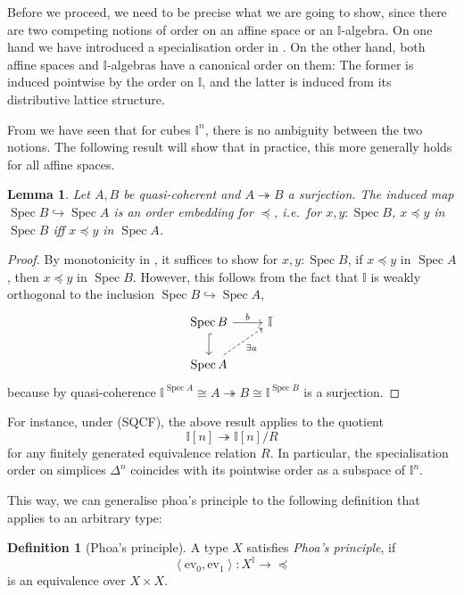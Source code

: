 \documentclass[12pt]{amsart}
\newtheorem{lemma}[theorem]{Lemma}
\theoremstyle{definition}
\newtheorem{definition}[theorem]{Definition}
\newcommand{\mbb}[1]{\mathbb{#1}}
\newcommand{\I}{\mbb I}
\newcommand{\pair}[1]{\left\langle#1\right\rangle}
\newcommand{\ev}{\mathrm{ev}}
\newcommand{\surj}{\twoheadrightarrow}
\newcommand{\hook}{\hookrightarrow}
\newcommand{\spec}{\operatorname{Spec}}
\begin{document}
Before we proceed, we need to be precise what we are going to show, since there are two competing notions of order on an affine space or an $\I$-algebra. On one hand we have introduced a specialisation order in . On the other hand, both affine spaces and $\I$-algebras have a canonical order on them: The former is induced pointwise by the order on $\I$, and the latter is induced from its distributive lattice structure. 

From  we have seen that for cubes $\I^n$, there is no ambiguity between the two notions. The following result will show that in practice, this more generally holds for all affine spaces.

\begin{lemma}\label{lem:orderonaffine}
  Let $A,B$ be quasi-coherent and $A \surj B$ a surjection. The induced map $\spec B \hook \spec A$ is an order embedding for $\preceq$, i.e.\ for $x,y : \spec B$, $x \preceq y$ in $\spec B$ iff $x \preceq y$ in $\spec A$.
\end{lemma}
\begin{proof}
  By monotonicity in , it suffices to show for $x,y : \spec B$, if $x \preceq y$ in $\spec A$, then $x \preceq y$ in $\spec B$. However, this follows from the fact that $\I$ is weakly orthogonal to the inclusion $\spec B \hook \spec A$,
  \[
  \begin{tikzcd}
    \spec B \ar[d, hook] \ar[r, "b"] & \I \\ 
    \spec A \ar[ur, dashed, "\exists a"'] 
  \end{tikzcd}
  \]
  because by quasi-coherence $\I^{\spec A} \cong A \surj B \cong \I^{\spec B}$ is a surjection. 
\end{proof}

For instance, under (SQCF), the above result applies to the quotient 
\[ \I[n] \surj \I[n]/R \]
for any finitely generated equivalence relation $R$. In particular, the specialisation order on simplices $\Delta^n$ coincides with its pointwise order as a subspace of $\I^n$.

This way, we can generalise phoa's principle to the following definition that applies to an arbitrary type:

\begin{definition}[Phoa's principle]\label{def:phoa}
  A type $X$ satisfies \emph{Phoa's principle}, if 
  \[ \pair{\ev_0,\ev_1} : X^\I \to \operatorname{\preceq} \]
  is an equivalence over $X \times X$.
\end{definition}
\end{document}

